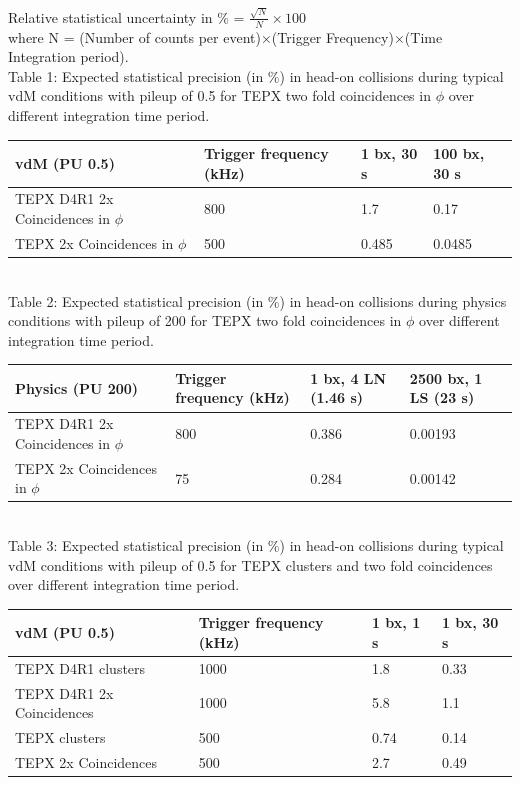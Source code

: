 Relative statistical uncertainty in $\%$ = $\frac{\sqrt{N}}{N} \times 100$ \\

where N = (Number of counts per event)$\times$(Trigger Frequency)$\times$(Time Integration period). \\


Table 1: Expected statistical precision (in $\%$) in head-on collisions during typical vdM conditions with pileup of 0.5 for TEPX two fold coincidences in $\phi$  over different integration time period. 
\begin{center}
    \begin{tabular}{ | l | l | l | p{5cm} |}
    \hline
    vdM (PU 0.5) & Trigger frequency (kHz) & 1 bx, 30 s & 100 bx, 30 s\\ \hline
    TEPX D4R1 2x Coincidences in $\phi$  & 800  & 1.7 & 0.17\\ \hline  
    TEPX 2x Coincidences in $\phi$  & 500  & 0.485 & 0.0485 \\ \hline 
    \hline
    \end{tabular}
\end{center} \\

Table 2: Expected statistical precision (in $\%$) in head-on collisions during physics conditions with pileup of 200 for TEPX two fold coincidences in $\phi$  over different integration time period. 
\begin{center}
    \begin{tabular}{ | l | l | l | p{5cm} |}
    \hline
    Physics (PU 200) & Trigger frequency (kHz) & 1 bx, 4 LN (1.46 s) & 2500 bx, 1 LS (23 s)\\ \hline
    TEPX D4R1 2x Coincidences in $\phi$  & 800  & 0.386 & 0.00193\\ \hline  
    TEPX 2x Coincidences in $\phi$  & 75  & 0.284 & 0.00142\\ \hline 
    \hline
    \end{tabular}
\end{center} \\


Table 3: Expected statistical precision (in $\%$) in head-on collisions during typical vdM conditions with pileup of 0.5 for TEPX clusters and two fold coincidences over different integration time period. 
\begin{center}
    \begin{tabular}{ | l | l | l | p{5cm} |}
    \hline
    vdM (PU 0.5) & Trigger frequency (kHz) & 1 bx, 1 s & 1 bx, 30 s \\ \hline
    TEPX D4R1 clusters  & 1000  & 1.8  & 0.33 \\ \hline  
    TEPX D4R1 2x Coincidences  & 1000  & 5.8 & 1.1 \\ \hline  
    TEPX clusters  & 500  & 0.74  & 0.14\\ \hline
    TEPX 2x Coincidences  & 500  & 2.7 & 0.49\\ \hline
    \hline
    \end{tabular}
\end{center}


